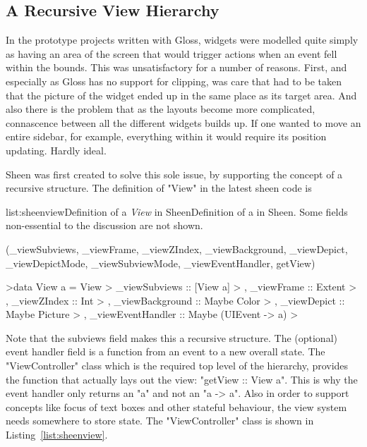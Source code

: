 \subsection{A Recursive View Hierarchy}

In the prototype projects written with Gloss, widgets were modelled quite simply as having an area of the screen that would trigger actions when an event fell within the bounds. This was unsatisfactory  for a number of reasons. First, and especially as Gloss has no support for clipping, was care that had to be taken that the picture of the widget ended up in the same place as its target area. And also there is the problem that as the layouts become more complicated, connascence between all the different widgets builds up. If one wanted to move an entire sidebar, for example, everything within it would require its position updating. Hardly ideal.

Sheen was first created to solve this sole issue, by supporting the concept of a recursive structure. The definition of "View" in the latest sheen code is

\vspace{-0.5em}
\begin{listing}{list:sheenview}{Definition of a \emph{View} in Sheen}{Definition of a  in Sheen. Some fields non-essential to the discussion are not shown.}{}
\end{listing}\vspace{-1.5em}

\functions(_viewSubviews, _viewFrame, _viewZIndex, _viewBackground, _viewDepict, _viewDepictMode, _viewSubviewMode, _viewEventHandler, getView)
\begin{haskell}

>data View a = View
>  {  _viewSubviews     :: [View a]
>  ,  _viewFrame        :: Extent
>  ,  _viewZIndex       :: Int
>  ,  _viewBackground   :: Maybe Color
>  ,  _viewDepict       :: Maybe Picture
>  ,  _viewEventHandler :: Maybe (UIEvent -> a)
>  }

\end{haskell}
\noindent 
Note that the subviews field makes this a recursive structure. The (optional) event handler field is a function from an event to a new overall state. The "ViewController" class which is the required top level of the hierarchy, provides the function that actually lays out the view: "getView :: View a". This is why the event handler only returns an "a" and not an "a -> a".
Also in order to support concepts like focus of text boxes and other stateful behaviour, the view system needs somewhere to store state. The "ViewController" class is shown in Listing~\ref{list:sheenview}.

